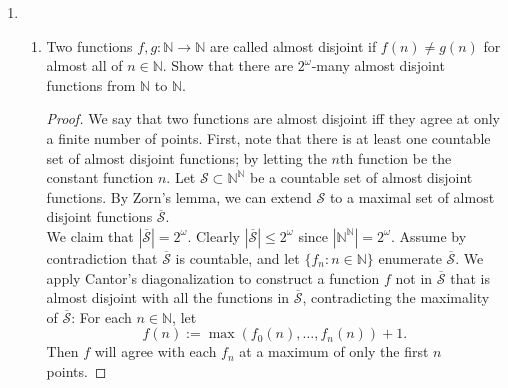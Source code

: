 \documentclass{article}
\begin{document}
\begin{enumerate}[label={\bf Q\arabic*:}]
\begin{proof}
      Consider the element $y-a\in\mathbb{S}$ and its multiplicative
      inverse $(y-a)^{-1}\in\mathbb{S}$. Since $a\in R_1$, we have $y-a>0$.
      Then the multiplicative inverse $(y-a)^{-1}$ must also be greater
      than 0, because $\mathcal{R}$ and thus $\mathcal{S}$ satisfies the
      sentence which says that the multiplicative inverse of a positive
      element is also positive. Then from assumption, $0\leq(y-a)^{-1}\leq
      N$ for some $N\in\mathbb{N}^+$. At the same time, since $a\not\in
      R_2$, we have $0<y-a<1/N$. Multiplying these two inequalities give us
      $1=(y-a)^{-1}\cdot(y-a)<N\cdot 1/N=1$, a contradiction. Note that we
      can multiply these inequalities because $\mathcal{R}$ and thus
      $\mathcal{S}$ satisfies the sentence that says if $0\leq a_1\leq a_2$
      and $0<b_1<b_2$ then $a_1\cdot b_1\leq a_2\cdot b_2$.
    \end{proof}

  \item
    \begin{enumerate}
      \item Two functions $f,g:\mathbb{N}\rightarrow\mathbb{N}$ are called
        almost disjoint if $f(n)\neq g(n)$ for almost all of
        $n\in\mathbb{N}$. Show that there are $2^\omega$-many almost
        disjoint functions from $\mathbb{N}$ to $\mathbb{N}$.

        \begin{proof}
          We say that two functions are almost disjoint iff they agree at
          only a finite number of points. First, note that there is at
          least one countable set of almost disjoint functions; by letting
          the $n$th function be the constant function $n$. Let
          $\mathcal{S}\subset\mathbb{N}^{\mathbb{N}}$ be a countable set of
          almost disjoint functions. By Zorn's lemma, we can extend
          $\mathcal{S}$ to a maximal set of almost disjoint functions
          $\overline{\mathcal{S}}$. \\

          We claim that $|\overline{\mathcal{S}}|=2^{\omega}$. Clearly
          $|\overline{\mathcal{S}}|\leq2^{\omega}$ since
          $|\mathbb{N}^{\mathbb{N}}|=2^{\omega}$. Assume by contradiction
          that $\overline{\mathcal{S}}$ is countable, and let
          $\{f_n:n\in\mathbb{N}\}$ enumerate $\overline{\mathcal{S}}$. We
          apply Cantor's diagonalization to construct a function $f$ not in
          $\overline{\mathcal{S}}$ that is almost disjoint with all the
          functions in $\overline{\mathcal{S}}$, contradicting the
          maximality of $\overline{\mathcal{S}}$: For each
          $n\in\mathbb{N}$, let
          \begin{equation*}
            f(n) := \max(f_0(n),\ldots,f_n(n))+1.
          \end{equation*}
          Then $f$ will agree with each $f_n$ at a maximum of only the
          first $n$ points.
        \end{proof}


\end{enumerate}
\end{enumerate}
\end{document}
